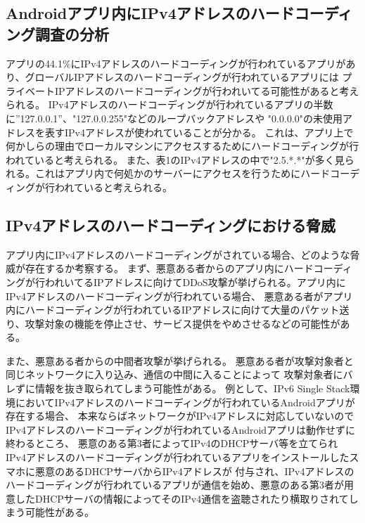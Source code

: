 \documentclass[a4j]{jarticle}
\begin{document}
\subsection{Androidアプリ内にIPv4アドレスのハードコーディング調査の分析}
アプリの44.1\%にIPv4アドレスのハードコーディングが行われているアプリがあり、グローバルIPアドレスのハードコーディングが行われているアプリには
プライベートIPアドレスのハードコーディングが行われいてる可能性があると考えられる。
IPv4アドレスのハードコーディングが行われているアプリの半数に”127.0.0.1”、"127.0.0.255"などのループバックアドレスや
"0.0.0.0"の未使用アドレスを表すIPv4アドレスが使われていることが分かる。
これは、アプリ上で何かしらの理由でローカルマシンにアクセスするためにハードコーディングが行われていると考えられる。
また、表1のIPv4アドレスの中で"2.5.*.*"が多く見られる。これはアプリ内で何処かのサーバーにアクセスを行うためにハードコーディングが行われていると考えられる。

\subsection{IPv4アドレスのハードコーディングにおける脅威}
アプリ内にIPv4アドレスのハードコーディングがされている場合、どのような脅威が存在するか考察する。
まず、悪意ある者からのアプリ内にハードコーディングが行われいてるIPアドレスに向けてDDoS攻撃が挙げられる。アプリ内にIPv4アドレスのハードコーディングが行われている場合、
悪意ある者がアプリ内にハードコーディングが行われているIPアドレスに向けて大量のパケット送り、攻撃対象の機能を停止させ、サービス提供をやめさせるなどの可能性がある。

また、悪意ある者からの中間者攻撃が挙げられる。
悪意ある者が攻撃対象者と同じネットワークに入り込み、通信の中間に入ることによって
攻撃対象者にバレずに情報を抜き取られてしまう可能性がある。
例として、IPv6 Single Stack環境においてIPv4アドレスのハードコーディングが行われているAndroidアプリが存在する場合、
本来ならばネットワークがIPv4アドレスに対応していないのでIPv4アドレスのハードコーディングが行われているAndroidアプリは動作せずに終わるところ、
悪意のある第3者によってIPv4のDHCPサーバ等を立てられ
IPv4アドレスのハードコーディングが行われているアプリをインストールしたスマホに悪意のあるDHCPサーバからIPv4アドレスが
付与され、IPv4アドレスのハードコーディングが行われているアプリが通信を始め、悪意のある第3者が用意したDHCPサーバの情報によってそのIPv4通信を盗聴されたり横取りされてしまう可能性がある。

\newpage
\end{document}
